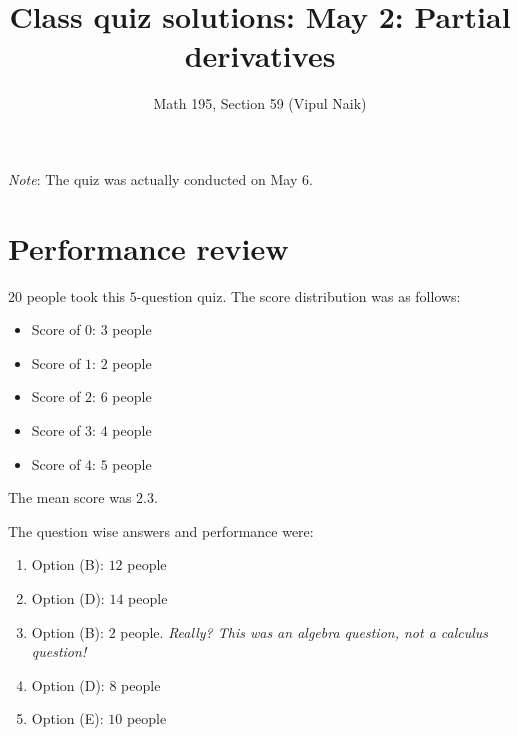 \documentclass[10pt]{amsart}
\title{Class quiz solutions: May 2: Partial derivatives}
\author{Math 195, Section 59 (Vipul Naik)}
\begin{document}
\maketitle

{\em Note}: The quiz was actually conducted on May 6.

\section{Performance review}

$20$ people took this $5$-question quiz. The score distribution was as
follows:

\begin{itemize}
\item Score of $0$: $3$ people
\item Score of $1$: $2$ people
\item Score of $2$: $6$ people
\item Score of $3$: $4$ people
\item Score of $4$: $5$ people
\end{itemize}
 
The mean score was $2.3$.
 
The question wise answers and performance were:

\begin{enumerate}
\item Option (B): $12$ people
\item Option (D): $14$ people
\item Option (B): $2$ people. {\em Really? This was an algebra
  question, not a calculus question!}
\item Option (D): $8$ people
\item Option (E): $10$ people
\end{enumerate}
\end{document}
